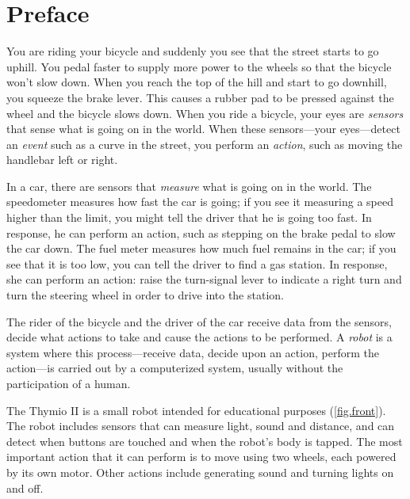 
\chapter*{Preface}


You are riding your bicycle and suddenly you see that the street starts
to go uphill. You pedal faster to supply more power to the wheels so
that the bicycle won't slow down. When you reach the top of the hill and
start to go downhill, you squeeze the brake lever. This causes a rubber
pad to be pressed against the wheel and the bicycle slows down.
When you ride a bicycle, your eyes are \textit{sensors} that sense what is
going on in the world. When these sensors---your eyes---detect an
\textit{event} such as a curve in the street, you perform an
\textit{action}, such as moving the handlebar left or right.

In a car, there are sensors that \textit{measure} what is going on in the
world. The speedometer measures how fast the car is going; if you see it
measuring a speed higher than the limit, you might tell the driver that
he is going too fast. In response, he can perform an action, such as
stepping on the brake pedal to slow the car down. The fuel meter
measures how much fuel remains in the car; if you see that it is too
low, you can tell the driver to find a gas station. In response, she can
perform an action: raise the turn-signal lever to indicate a right turn
and turn the steering wheel in order to drive into the station.

The rider of the bicycle and the driver of the car receive data from
the sensors, decide what actions to take and cause the actions to be
performed. A \textit{robot} is a system where this process---receive data,
decide upon an action, perform the action---is carried out by a
computerized system, usually without the participation of a human.


The Thymio II is a small robot intended for educational purposes
(\cref{fig.front}). The robot includes sensors that can measure
light, sound and distance, and can detect when buttons are touched and
when the robot's body is tapped. The most important action that it can
perform is to move using two wheels, each powered by its own motor.
Other actions include generating sound and turning lights on and off.

